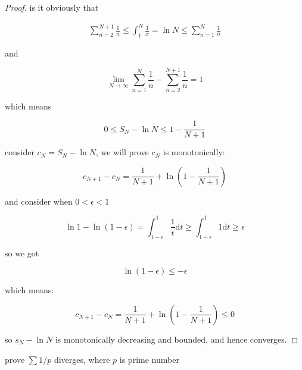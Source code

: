 \begin{proof}
    is it obviously that

    \begin{align*}
 \sum_{n=2}^{N+1} \frac{1}{n}  \le \int_1^{N} \frac{1}{x} = \ln N \le \sum_{n=1}^{N} \frac{1}{n}
    \end{align*}

    and

    \[
        \lim_{N \to \infty}\sum_{n=1}^{N} \frac{1}{n} -\sum_{n=2}^{N+1} \frac{1}{n} = 1
    \]

    which means

    \[
        0 \le S_N - \ln N \le 1- \frac{1}{N+1}
    \]

    consider $c_N = S_N - \ln N$, we will prove $c_N$ is monotonically:

    \[
        c_{N+1} - c_N = \frac{1}{N+1} + \ln (1 - \frac{1}{N+1})
    \]

    and consider when $0 < \epsilon < 1$

    \[
       \ln1 - \ln (1 - \epsilon) = \int_{1-\epsilon}^{1} \frac{1}{t} \mathrm{d}t \ge \int_{1-\epsilon}^{1} 1 \mathrm{d}t \ge  \epsilon
    \]

    so we got

    \[
        \ln(1-\epsilon) \le -\epsilon
    \]
    
    which means:

    \[
        c_{N+1} - c_N = \frac{1}{N+1} + \ln (1 - \frac{1}{N+1}) \le 0
    \]

    so $s_N - \ln N$ is monotonically decreasing and bounded, and hence converges.
\end{proof}


\begin{exercise}
    prove $\sum 1/p $ diverges, where $p$ is prime number
\end{exercise}

